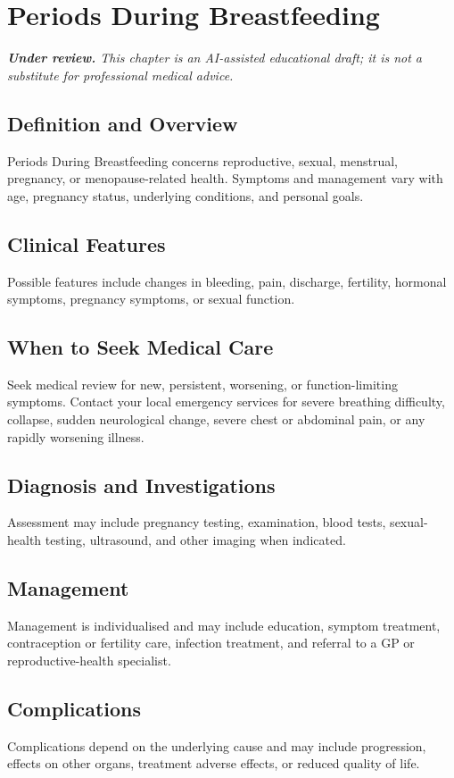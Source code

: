 \chapter{Periods During Breastfeeding}

\medskip
\noindent\textit{\textbf{Under review.} This chapter is an AI-assisted educational draft; it is not a substitute for professional medical advice.}

\section*{Definition and Overview}
Periods During Breastfeeding concerns reproductive, sexual, menstrual, pregnancy, or menopause-related health. Symptoms and management vary with age, pregnancy status, underlying conditions, and personal goals.

\section*{Clinical Features}
Possible features include changes in bleeding, pain, discharge, fertility, hormonal symptoms, pregnancy symptoms, or sexual function.

\section*{When to Seek Medical Care}
Seek medical review for new, persistent, worsening, or function-limiting symptoms. Contact your local emergency services for severe breathing difficulty, collapse, sudden neurological change, severe chest or abdominal pain, or any rapidly worsening illness.

\section*{Diagnosis and Investigations}
Assessment may include pregnancy testing, examination, blood tests, sexual-health testing, ultrasound, and other imaging when indicated.

\section*{Management}
Management is individualised and may include education, symptom treatment, contraception or fertility care, infection treatment, and referral to a GP or reproductive-health specialist.

\section*{Complications}
Complications depend on the underlying cause and may include progression, effects on other organs, treatment adverse effects, or reduced quality of life.

